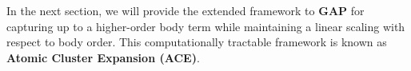 
In the next section, we will provide the extended framework to \textbf{GAP} for capturing up to a higher-order body term while maintaining a linear scaling with respect to body order. 
This computationally tractable framework is known as \textbf{Atomic Cluster Expansion (ACE)}.



